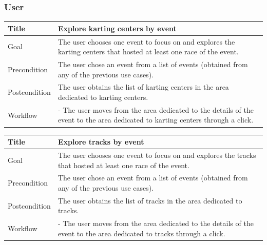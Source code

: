 \documentclass{beamer}
\begin{document}


\begin{frame}
    \frametitle{User}
    \begin{table}
        \tiny
        \begin{tabular}{|p{2cm}|p{6cm}|}
        \hline
        Title & \textbf{Explore karting centers by event} \\
        \hline
        Goal & The user chooses one event to focus on and explores the karting centers that hosted at least
        one race of the event. \\
        \hline
        Precondition & The user chose an event from a list of events (obtained from any of the previous use cases).\\
        \hline
        Postcondition & The user obtains the list of karting centers in the area dedicated to karting centers. \\
        \hline
        Workflow &
        - The user moves from the area dedicated to the details of the event to the
        area dedicated to karting centers through a click. \\
        \hline
        \end{tabular}
\end{table}

\begin{table}
    \tiny
    \begin{tabular}{|p{2cm}|p{6cm}|}
    \hline
    Title & \textbf{Explore tracks by event} \\
    \hline
    Goal & The user chooses one event to focus on and explores the tracks that hosted at least
    one race of the event. \\
    \hline
    Precondition & The user chose an event from a list of events (obtained from any of the previous use cases).\\
    \hline
    Postcondition & The user obtains the list of tracks in the area dedicated to tracks. \\
    \hline
    Workflow &
    - The user moves from the area dedicated to the details of the event to the
    area dedicated to tracks through a click. \\
    \hline
    \end{tabular}
\end{table}
\end{frame}
\end{document}

